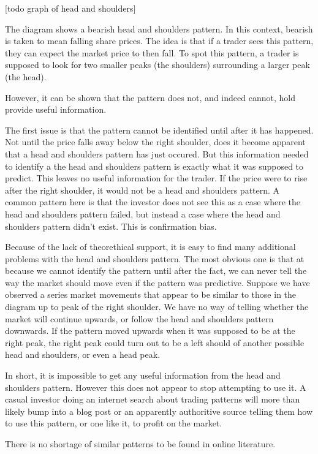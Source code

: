 \documentclass{report}
\begin{document}
[todo graph of head and shoulders]

The diagram shows a bearish head and shoulders pattern. In this context, bearish is taken to mean falling share prices. The idea is that if a trader sees this pattern, they can expect the market price to then fall. To spot this pattern, a trader is supposed to look for two smaller peaks (the shoulders) surrounding a larger peak (the head). 

However, it can be shown that the pattern does not, and indeed cannot, hold provide useful information. 

The first issue is that the pattern cannot be identified until after it has happened. Not until the price falls away below the right shoulder, does it become apparent that a head and shoulders pattern has just occured. But this information needed to identify a the head and shoulders pattern is exactly what it was supposed to predict. This leaves no useful information for the trader. If the price were to rise after the right shoulder, it would not be a head and shoulders pattern. A common pattern here is that the investor does not see this as a case where the head and shoulders pattern failed, but instead a case where the head and shoulders pattern didn't exist. This is confirmation bias.

Because of the lack of theorethical support, it is easy to find many additional problems with the head and shoulders pattern. The most obvious one is that at because we cannot identify the pattern until after the fact, we can never tell the way the market should move even if the pattern was predictive. Suppose we have observed a series market movements that appear to be similar to those in the diagram up to peak of the right shoulder. We have no way of telling whether the market will continue upwards, or follow the head and shoulders pattern downwards. If the pattern moved upwards when it was supposed to be at the right peak, the right peak could turn out to be a left should of another possible head and shoulders, or even a head peak.

In short, it is impossible to get any useful information from the head and shoulders pattern. However this does not appear to stop attempting to use it. A casual investor doing an internet search about trading patterns will more than likely bump into a blog post or an apparently authoritive source telling them how to use this pattern, or one like it, to profit on the market. 

There is no shortage of similar patterns to be found in online literature.
\end{document}
